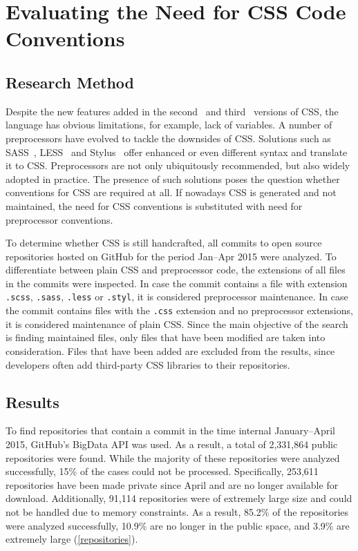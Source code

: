 \chapter{Evaluating the Need for CSS Code Conventions}
\label{sec:evaluating}

\section{Research Method}

Despite the new features added in the second~\cite{CSS2} and third~\cite{CSS3}
versions of CSS, the language has obvious limitations, for example, lack of
variables. A number of preprocessors have evolved to tackle the downsides of
CSS. Solutions such as SASS~\cite{SASS}, LESS~\cite{LESS} and
Stylus~\cite{Stylus} offer enhanced or even different syntax and translate it
to CSS. Preprocessors are not only ubiquitously recommended, but also widely
adopted in practice. The presence of such solutions poses the question whether
conventions for CSS are required at all. If nowadays CSS is generated and not
maintained, the need for CSS conventions is substituted with need for
preprocessor conventions.

To determine whether CSS is still handcrafted, all commits to open source
repositories hosted on GitHub for the period Jan--Apr 2015 were analyzed. To
differentiate between plain CSS and preprocessor code, the extensions of all
files in the commits were inspected. In case the commit contains a file with
extension \texttt{.scss}, \texttt{.sass}, \texttt{.less} or \texttt{.styl}, it
is considered preprocessor maintenance. In case the commit contains files with
the \texttt{.css} extension and no preprocessor extensions, it is considered
maintenance of plain CSS. Since the main objective of the search is finding
maintained files, only files that have been modified are taken into
consideration. Files that have been added are excluded from the results, since
developers often add third-party CSS libraries to their repositories.


\section{Results}

To find repositories that contain a commit in the time internal January--April
2015, GitHub's BigData API was used. As a result, a total of 2,331,864 public
repositories were found. While the majority of these repositories were
analyzed successfully, 15\% of the cases could not be processed. Specifically,
253,611 repositories have been made private since April and are no longer
available for download. Additionally, 91,114 repositories were of extremely
large size and could not be handled due to memory constraints. As a result,
85.2\% of the repositories were analyzed successfully, 10.9\% are no longer in
the public space, and 3.9\% are extremely large (\autoref{repositories}).

